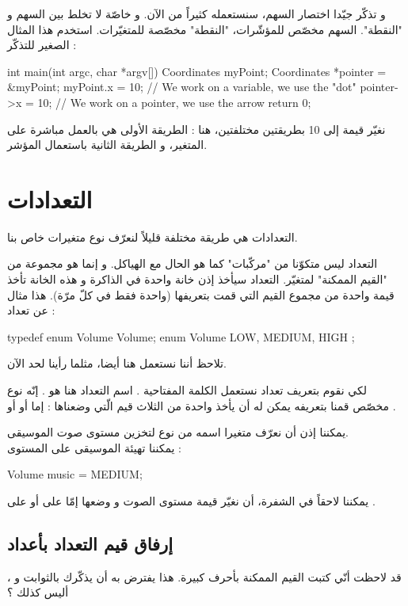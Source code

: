 و تذكّر جيّدا اختصار السهم، سنستعمله كثيراً من الآن. و خاصّة لا تخلط بين السهم و "النقطة". السهم مخصّص للمؤشّرات، "النقطة" مخصّصة للمتغيّرات. استخدم هذا المثال الصغير للتذكّر :

\begin{Csource}
int main(int argc, char *argv[])
{
	Coordinates  myPoint;
	Coordinates *pointer = &myPoint;
	myPoint.x = 10; // We work on a variable, we use the "dot"
	pointer->x = 10; // We work on a pointer, we use the arrow
	return 0;
}
\end{Csource}

نغيّر قيمة
إلى 10 بطريقتين مختلفتين، هنا : الطريقة الأولى هي بالعمل مباشرة على المتغير، و الطريقة الثانية باستعمال المؤشر.

\section{التعدادات}

التعدادات هي طريقة مختلفة قليلاً لنعرّف نوع متغيرات خاص بنا.

التعداد ليس متكوّنا من "مركّبات"  كما هو الحال مع الهياكل. و إنما هو مجموعة من "القيم الممكنة" لمتغيّر. التعداد سيأخذ إذن خانة واحدة في الذاكرة و هذه الخانة تأخذ قيمة واحدة من مجموع القيم التي قمت بتعريفها (واحدة فقط في كلّ مرّة).
هذا مثال عن تعداد :
\begin{Csource}
typedef enum Volume Volume;
enum Volume
{
	LOW, MEDIUM, HIGH
};
\end{Csource}
تلاحظ أننا نستعمل
هنا أيضا، مثلما رأينا لحد الآن.

لكي نقوم بتعريف تعداد نستعمل الكلمة المفتاحية
.
اسم التعداد هنا هو
.
إنّه نوع مخصّص قمنا بتعريفه يمكن له أن يأخذ واحدة من الثلاث قيم الّتي وضعناها : إما
أو
أو
.

يمكننا إذن أن نعرّف متغيرا اسمه
من نوع
لتخزين مستوى صوت الموسيقى.\\
يمكننا تهيئة الموسيقى على المستوى
 :
\begin{Csource}
Volume music = MEDIUM;
\end{Csource}
يمكننا لاحقاً في الشفرة، أن نغيّر قيمة مستوى الصوت و وضعها إمّا على
أو على
.

\subsection{إرفاق قيم التعداد بأعداد}
قد لاحظت أنّي كتبت القيم الممكنة بأحرف كبيرة. هذا يفترض به أن يذكّرك بالثوابت و
،
أليس كذلك ؟

